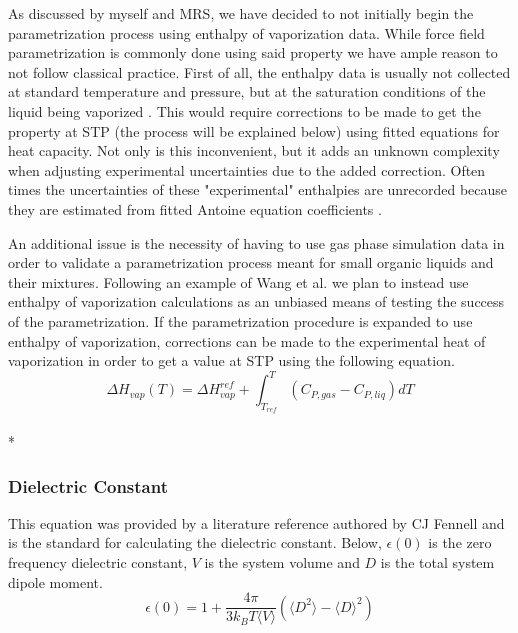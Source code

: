 \documentclass[aps,pre,twocolumn,nofootinbib,superscriptaddress,linenumbers,10pt, draft,tightenlines]{revtex4-1}
\begin{document}
As discussed by myself and MRS, we have decided to not initially begin the parametrization process using enthalpy of vaporization data. While force field parametrization is commonly done using said property we have ample reason to not follow classical practice. First of all, the enthalpy data is usually not collected at standard temperature and pressure, but at the saturation conditions of the liquid being vaporized \cite{chickos}.  This would require corrections to be made to get the property at STP (the process will be explained below) using fitted equations for heat capacity. Not only is this inconvenient, but it adds an unknown complexity when adjusting experimental uncertainties due to the added correction. Often times the uncertainties of these "experimental" enthalpies are unrecorded because they are estimated from fitted Antoine equation coefficients \cite{chickos}. 

An additional issue is the necessity of having to use gas phase simulation data in order to validate a parametrization process meant for small organic liquids and their mixtures. Following an example of Wang et al. \cite{FF99vdw} we plan to instead use enthalpy of vaporization calculations as an unbiased means of testing the success of the parametrization. If the parametrization procedure is expanded to use enthalpy of vaporization, corrections can be made to the experimental heat of vaporization in order to get a value at STP using the following equation.
\begin{equation}\Delta H_{vap}(T) = \Delta H_{vap}^{ref} + \int_{T_{ref}}^T \left(C_{P, gas} - C_{P, liq}\right) dT \end{equation}\\*
    

\subsubsection{Dielectric Constant}
This equation was provided by a literature reference authored by CJ Fennell\cite{dielec} and is the standard for calculating the dielectric constant. Below, $\epsilon(0)$ is the zero frequency dielectric constant, $V$ is the system volume and $D$ is the total system dipole moment. 
\begin{equation} \epsilon(0) = 1 + \frac{4 \pi}{3 k_B T \langle V \rangle}(\langle D^2 \rangle - \langle D \rangle^2) \end{equation}
\end{document}
